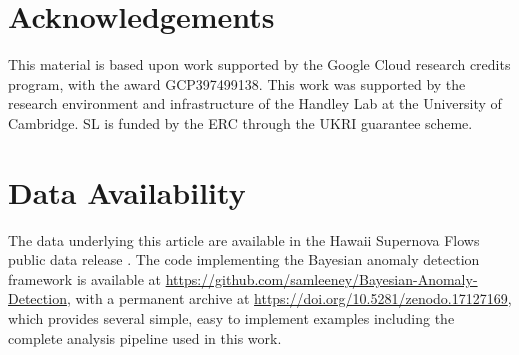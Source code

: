 \documentclass[fleqn,usenatbib]{mnras}
\begin{document}



\section*{Acknowledgements}
This material is based upon work supported by the Google Cloud research credits program, with the award GCP397499138. This work was supported by the research environment and infrastructure of the Handley Lab at the University of Cambridge. SL is funded by the ERC through the UKRI guarantee scheme.

\section*{Data Availability}
The data underlying this article are available in the Hawaii Supernova Flows public data release \citep{do2025hawaii}. The code implementing the Bayesian anomaly detection framework is available at \url{https://github.com/samleeney/Bayesian-Anomaly-Detection}, with a permanent archive at \url{https://doi.org/10.5281/zenodo.17127169}, which provides several simple, easy to implement examples including the complete analysis pipeline used in this work.









\bsp    %
\label{lastpage}
\end{document}
